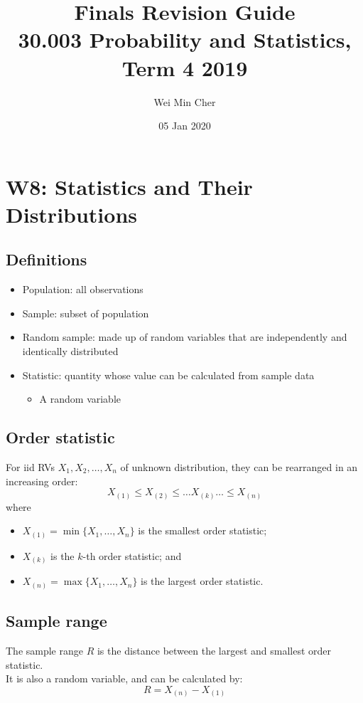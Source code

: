\documentclass[a4paper]{article}
\begin{document}
\title{Finals Revision Guide\\[0.1cm]
    \large 30.003 Probability and Statistics, Term 4 2019}
\author{Wei Min Cher}
\date{05 Jan 2020}

\maketitle

\tableofcontents

\newpage
\section{W8: Statistics and Their Distributions}
\subsection{Definitions}
\begin{itemize}
    \item Population: all observations
    \item Sample: subset of population
    \item Random sample: made up of random variables that are independently and identically distributed
    \item Statistic: quantity whose value can be calculated from sample data
    \begin{itemize}[label=$\circ$]
        \item A random variable
    \end{itemize}
\end{itemize}
\subsection{Order statistic}
For iid RVs $X_{1}, X_{2}, \ldots , X_{n}$ of unknown distribution, they can be rearranged in an increasing order:
$$X_{(1)}\leq X_{(2)}\leq \ldots X_{(k)} \ldots \leq X_{(n)}$$
where
\begin{itemize}
    \item $X_{(1)} = \min\{X_{1}, \ldots , X_{n}\}$ is the smallest order statistic;
    \item $X_{(k)}$ is the $k$-th order statistic; and
    \item $X_{(n)} = \max\{X_{1}, \ldots , X_{n}\}$ is the largest order statistic.
\end{itemize}
\subsection{Sample range}
The sample range $R$ is the distance between the largest and smallest order statistic.\\
It is also a random variable, and can be calculated by:
$$R = X_{(n)} - X_{(1)}$$
\end{document}
